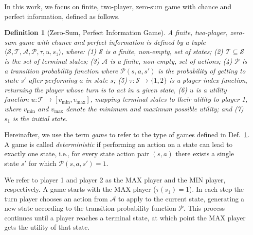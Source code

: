 \documentclass[letterpaper]{article} %
\newtheorem{definition}{Definition}
\newcommand{\vmax}{v_{\text{max}}}
\newcommand{\vmin}{v_{\text{min}}}
\newcommand{\tuple}[1]{\langle #1 \rangle}
\begin{document}
In this work, we focus on finite, two-player, zero-sum game with chance and perfect information, defined as follows. 
\begin{definition}[Zero-Sum, Perfect Information Game]
A finite, two-player, zero-sum game with chance and perfect information is defined by a tuple $\tuple{\mathcal{S}, \mathcal{T}, \mathcal{A}, \mathcal{P}, \tau, u, s_1}$, where:
(1) $\mathcal{S}$ is a finite, non-empty, set of states; 
(2) $\mathcal{T}\subseteq \mathcal{S}$ is the set of terminal states; 
(3) $\mathcal{A}$ is a finite, non-empty, set of actions; 
(4) $\mathcal{P}$ is a transition probability function where $\mathcal{P}(s,a,s')$ is the probability of getting to state $s'$ after performing $a$ in state $s$; 
(5) $\tau:\mathcal{S}\rightarrow\{1,2\}$ is a player index function, returning the player whose turn is to act in a given state, 
(6) $u$ is a utility function $u:\mathcal{T}\rightarrow [\vmin,\vmax]$, mapping terminal states to their utility to player 1, where $\vmin$ and $\vmax$ denote the minimum and maximum possible utility; 
and (7) $s_1$ is the initial state. 
\label{def:game-with-chance}
\end{definition}
Hereinafter, we use the term \emph{game} to refer to the type of games defined in Def.~\ref{def:game-with-chance}. A game is called \emph{deterministic} if performing an action on a state can lead to exactly one state, i.e., for every state action pair $(s,a)$ there exists a single state $s'$ for which $\mathcal{P}(s,a,s')=1$. 



We refer to player 1 and player 2 as the MAX player and the MIN player, respectively. A game starts with the MAX player ($\tau(s_1)=1$).
In each step the turn player chooses an action from $\mathcal{A}$ to apply to the current state, generating a new state according to the transition probability function $\mathcal{P}$.
This process continues until a player reaches a terminal state, at which point the MAX player gets the utility of that state. %
\end{document}
